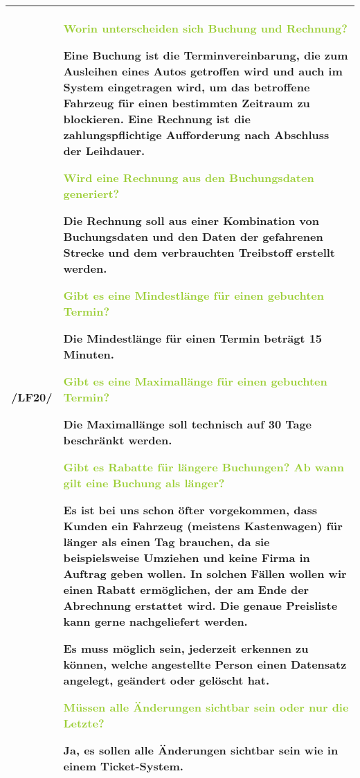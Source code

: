 \begin{tabular}{l | p{13cm}}
    \hline
    /LF20/ & \textcolor{YellowGreen}{Worin unterscheiden sich Buchung und Rechnung?}

    \textcolor{NavyBlue}{Eine Buchung ist die Terminvereinbarung, die zum Ausleihen eines Autos getroffen wird und auch im System eingetragen wird, um das betroffene Fahrzeug für einen bestimmten Zeitraum zu blockieren. Eine Rechnung ist die zahlungspflichtige Aufforderung nach Abschluss der Leihdauer.}

    \textcolor{YellowGreen}{Wird eine Rechnung aus den Buchungsdaten generiert?}

    \textcolor{NavyBlue}{Die Rechnung soll aus einer Kombination von Buchungsdaten und den Daten der gefahrenen Strecke und dem verbrauchten Treibstoff erstellt werden.}

    \textcolor{YellowGreen}{Gibt es eine Mindestlänge für einen gebuchten Termin?}

    \textcolor{NavyBlue}{Die Mindestlänge für einen Termin beträgt 15 Minuten.}

    \textcolor{YellowGreen}{Gibt es eine Maximallänge für einen gebuchten Termin?}

    \textcolor{NavyBlue}{Die Maximallänge soll technisch auf 30 Tage beschränkt werden.}

    \textcolor{YellowGreen}{Gibt es Rabatte für längere Buchungen? Ab wann gilt eine Buchung als länger?}

    \textcolor{NavyBlue}{Es ist bei uns schon öfter vorgekommen, dass Kunden ein Fahrzeug (meistens Kastenwagen) für länger als einen Tag brauchen, da sie beispielsweise Umziehen und keine Firma in Auftrag geben wollen. In solchen Fällen wollen wir einen Rabatt ermöglichen, der am Ende der Abrechnung erstattet wird. Die genaue Preisliste kann gerne nachgeliefert werden.}

    Es muss möglich sein, jederzeit erkennen zu können, welche angestellte Person einen Datensatz angelegt, geändert oder gelöscht hat. 
    
    \textcolor{YellowGreen}{Müssen alle Änderungen sichtbar sein oder nur die Letzte?}

    \textcolor{NavyBlue}{Ja, es sollen alle Änderungen sichtbar sein wie in einem Ticket-System.}
    \\
    \hline
\end{tabular}

